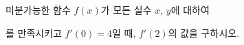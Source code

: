 미분가능한 함수 $f(x)$가 모든 실수 $x$, $y$에 대하여 \par\smallskip{}\par\smallskip\noindent 를 만족시키고 $f'(0)=4$일 때, $f'(2)$의 값을 구하시오.
